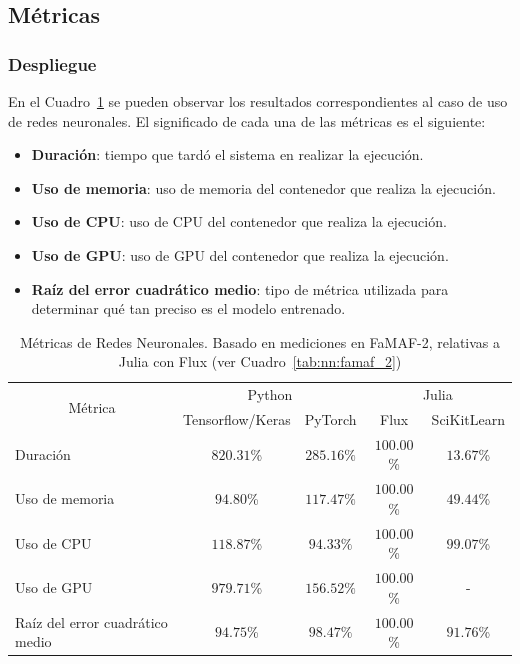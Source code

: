 \documentclass[11pt]{article}
\let\Oldsubsection\subsection
\renewcommand{\subsection}{\FloatBarrier\Oldsubsection}
\let\Oldsubsubsection\subsubsection
\renewcommand{\subsubsection}{\FloatBarrier\Oldsubsubsection}
\begin{document}
\subsection{Métricas}

\subsubsection{Despliegue}

En el Cuadro~\ref{tab:nn:metrics} se pueden observar los resultados correspondientes al caso de uso de redes neuronales. El significado de cada una de las métricas es el siguiente:

\begin{itemize}
    \item \textbf{Duración}: tiempo que tardó el sistema en realizar la ejecución.
    \item \textbf{Uso de memoria}: uso de memoria del contenedor que realiza la ejecución.
    \item \textbf{Uso de CPU}: uso de CPU del contenedor que realiza la ejecución.
    \item \textbf{Uso de GPU}: uso de GPU del contenedor que realiza la ejecución.
    \item \textbf{Raíz del error cuadrático medio}: tipo de métrica utilizada para determinar qué tan preciso es el modelo entrenado.
\end{itemize}

\begin{table}[H]
\centering
\begin{tabular}{|l|cc|cc|}
\hline
\multicolumn{1}{|c|}{\multirow{2}{*}{Métrica}} & \multicolumn{2}{c|}{Python} & \multicolumn{2}{c|}{Julia} \\ \cline{2-5} 
\multicolumn{1}{|c|}{} & \multicolumn{1}{c|}{Tensorflow/Keras} & PyTorch & \multicolumn{1}{c|}{Flux} & SciKitLearn \\ \hline
Duración & \multicolumn{1}{c|}{$820.31$\%} & $285.16\%$& \multicolumn{1}{c|}{$100.00$\%} & \multicolumn{1}{c|}{$13.67$\%} \\ \hline
Uso de memoria & \multicolumn{1}{c|}{$94.80$\%} & $117.47\%$& \multicolumn{1}{c|}{$100.00$\%} & \multicolumn{1}{c|}{$49.44$\%} \\ \hline
Uso de CPU & \multicolumn{1}{c|}{$118.87$\%} & $94.33\%$& \multicolumn{1}{c|}{$100.00$\%} & \multicolumn{1}{c|}{$99.07$\%} \\ \hline
Uso de GPU & \multicolumn{1}{c|}{$979.71$\%} & $156.52\%$& \multicolumn{1}{c|}{$100.00$\%} & - \\ \hline
Raíz del error cuadrático medio & \multicolumn{1}{c|}{$94.75$\%} & $98.47\%$& \multicolumn{1}{c|}{$100.00$\%} & \multicolumn{1}{c|}{$91.76$\%} \\ \hline
\end{tabular}
\caption{Métricas de Redes Neuronales. Basado en mediciones en FaMAF-2, relativas a Julia con Flux (ver Cuadro~\ref{tab:nn:famaf_2})}
\label{tab:nn:metrics}
\end{table}
\end{document}
